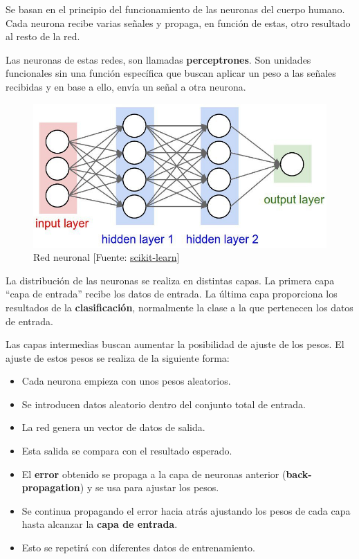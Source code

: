 	Se basan en el principio del funcionamiento de las neuronas del cuerpo humano. Cada neurona recibe varias señales y propaga, en función de estas, otro resultado al resto de la red.

	Las neuronas de estas redes, son llamadas \textbf{perceptrones}. Son unidades funcionales sin una función específica que buscan aplicar un peso a las señales recibidas y en base a ello, envía un señal a otra neurona.

	\begin{figure}[htb]
		\begin{center}
			\includegraphics[width=4.5in]{figures/neural_network.jpg}
			\caption{Red neuronal [Fuente: \href{www.scikit-learn.org}{scikit-learn}]}
		\end{center}
		\label{network}
	\end{figure}

	La distribución de las neuronas se realiza en distintas capas. La primera capa ``capa de entrada'' recibe los datos de entrada. La última capa proporciona los resultados de la \textbf{clasificación}, normalmente la clase a la que pertenecen los datos de entrada.

	Las capas intermedias buscan aumentar la posibilidad de ajuste de los pesos. El ajuste de estos pesos se realiza de la siguiente forma:

	\begin{itemize}
		\item Cada neurona empieza con unos pesos aleatorios.
		\item Se introducen datos aleatorio dentro del conjunto total de entrada.
		\item La red genera un vector de datos de salida.
		\item Esta salida se compara con el resultado esperado.
		\item El \textbf{error} obtenido se propaga a la capa de neuronas anterior (\textbf{back-propagation}) y se usa para ajustar los pesos.
		\item Se continua propagando el error hacia atrás ajustando los pesos de cada capa hasta alcanzar la \textbf{capa de entrada}.
		\item Esto se repetirá con diferentes datos de entrenamiento.
 	\end{itemize}

